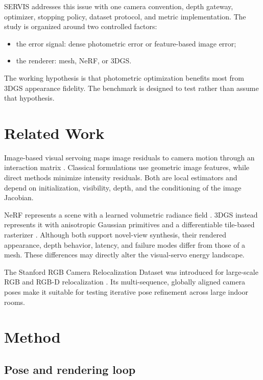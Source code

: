 \documentclass[10pt,twocolumn]{article}
\newcommand{\method}{\textsc{SERVIS}}
\begin{document}
\method{} addresses this issue with one camera convention, depth gateway,
optimizer, stopping policy, dataset protocol, and metric implementation. The
study is organized around two controlled factors:

\begin{itemize}
  \item the error signal: dense photometric error or feature-based image error;
  \item the renderer: mesh, NeRF, or 3DGS.
\end{itemize}

The working hypothesis is that photometric optimization benefits most from
3DGS appearance fidelity. The benchmark is designed to test rather than assume
that hypothesis.

\section{Related Work}

Image-based visual servoing maps image residuals to camera motion through an
interaction matrix \cite{hutchinson1996tutorial}. Classical formulations use
geometric image features, while direct methods minimize intensity residuals.
Both are local estimators and depend on initialization, visibility, depth, and
the conditioning of the image Jacobian.

NeRF represents a scene with a learned volumetric radiance field
\cite{mildenhall2020nerf}. 3DGS instead represents it with anisotropic Gaussian
primitives and a differentiable tile-based rasterizer
\cite{kerbl20233d}. Although both support novel-view synthesis, their rendered
appearance, depth behavior, latency, and failure modes differ from those of a
mesh. These differences may directly alter the visual-servo energy landscape.

The Stanford RGB Camera Relocalization Dataset was introduced for large-scale
RGB and RGB-D relocalization \cite{valentin2016learning}. Its multi-sequence,
globally aligned camera poses make it suitable for testing iterative pose
refinement across large indoor rooms.

\section{Method}

\subsection{Pose and rendering loop}
\end{document}
